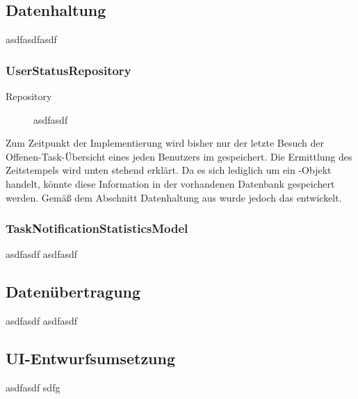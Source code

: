 \subsection{Datenhaltung}
\label{sub:Datenhaltung}
asdfasdfasdf 

\subsubsection{UserStatusRepository}
\label{subsub:UserStatusRepository}
\begin{description}
    \item [Repository]
    asdfasdf
\end{description}

Zum Zeitpunkt der Implementierung wird bisher nur der letzte Besuch der Offenen-Task-Übersicht eines jeden Benutzers im
 gespeichert. Die Ermittlung des Zeitstempels wird unten stehend erklärt. Da es sich lediglich um ein
-Objekt handelt, könnte diese Information in der vorhandenen Datenbank gespeichert werden. Gemäß dem Abschnitt
Datenhaltung aus  wurde jedoch das  entwickelt.

\subsubsection{TaskNotificationStatisticsModel}
\label{subsub:TaskNotificationStatisticsModel}
asdfasdf  asdfasdf

\subsection{Datenübertragung}
\label{sub:Datenübertragung}
asdfasdf \ggfs asdfasdf

\subsection{UI-Entwurfsumsetzung}
\label{sub:UI-Entwurfsumsetzung}
asdfasdf  sdfg

